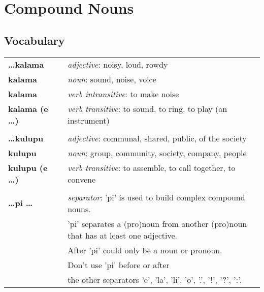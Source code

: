 \section{Compound Nouns}
%
\subsection*{Vocabulary}
%
\begin{supertabular}{p{2,5cm}|ll}
%
\textbf{\dots kalama} && \textit{adjective}: noisy, loud, rowdy \\ %
\textbf{kalama} && \textit{noun}: sound, noise, voice \\ 
\textbf{kalama} && \textit{verb intransitive}: to make noise \\ %
\textbf{kalama (e \dots)} && \textit{verb transitive}: to sound, to ring, to play (an instrument) \\ %
 && \\ %
%
\textbf{\dots kulupu} && \textit{adjective}: communal, shared, public, of the society \\ %
\textbf{kulupu} && \textit{noun}: group, community, society, company, people \\ %
\textbf{kulupu (e \dots)} && \textit{verb transitive}: to assemble, to call together, to convene \\ %
 && \\ %
%
\textbf{\dots pi \dots } && \textit{separator}: 'pi' is used to build complex compound nouns. \\ && 'pi' separates a (pro)noun from another (pro)noun that has at least one adjective. \\ && After 'pi' could only be a noun or pronoun. \\ && Don't use 'pi' before or after \\ && the other separators 'e', 'la', 'li', 'o', '.', '!', '?', ':'.  \\ %
\end{supertabular} \\
%
\newpage
%
